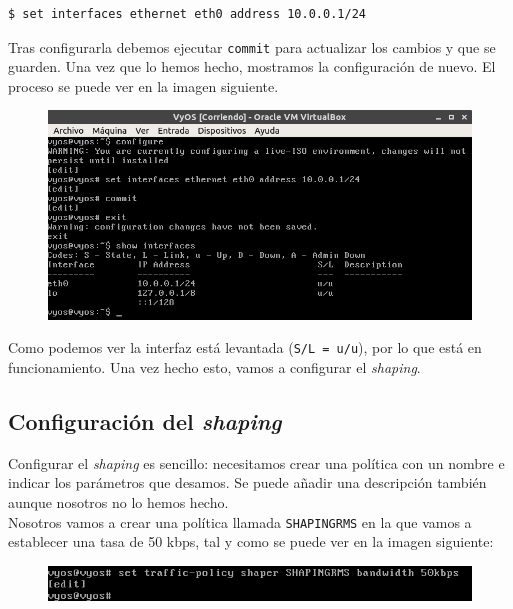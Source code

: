 \documentclass[11pt,a4paper]{article}
\begin{document}
\begin{lstlisting}[language=bash]
$ set interfaces ethernet eth0 address 10.0.0.1/24
\end{lstlisting}

\vspace{0.3cm} Tras configurarla debemos ejecutar \texttt{commit} para actualizar los cambios y que se guarden. Una vez que lo hemos hecho, mostramos la configuración de nuevo. El proceso se puede ver en la imagen siguiente.

\begin{figure}[H]
	\centering
	\includegraphics[scale=0.5]{img/show-interfaces-fin.png}
\end{figure}

Como podemos ver la interfaz está levantada (\texttt{S/L = u/u}), por lo que está en funcionamiento. Una vez hecho esto, vamos a configurar el \textit{shaping}.

\newpage

\subsection{Configuración del \textit{shaping}}

Configurar el \textit{shaping} es sencillo: necesitamos crear una política con un nombre e indicar los parámetros que desamos. Se puede añadir una descripción también aunque nosotros no lo hemos hecho.\\

Nosotros vamos a crear una política llamada \texttt{SHAPINGRMS} en la que vamos a establecer una tasa de 50 kbps, tal y como se puede ver en la imagen siguiente:

\begin{figure}[H]
	\centering
	\includegraphics[scale=0.5]{img/shaping.png}
\end{figure}
\end{document}
